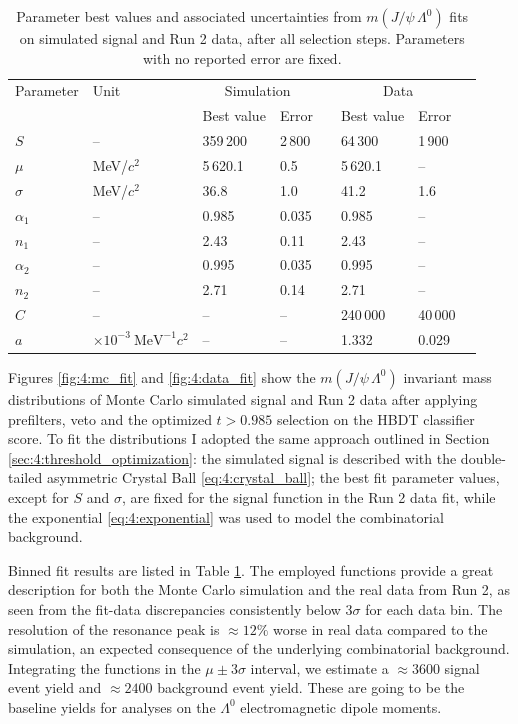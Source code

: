 \begin{table}
	\begin{center}
	\begin{tabular}{@{}llllllll@{}}
		\toprule
		Parameter
		& Unit
		& \multicolumn{2}{c}{Simulation}	& \phantom{a}
		& \multicolumn{2}{c}{Data} \\
		\cmidrule{3-4} \cmidrule{6-7}
		&& Best value	& Error				&& Best value	& Error \\
		\midrule
		$S$			& --		& 359\,200	& 2\,800&& 64\,300	& 1\,900	\\
		$\mu$		& MeV/$c^2$	& 5\,620.1 	& 0.5	&& 5\,620.1	& -- 		\\
		$\sigma$	& MeV/$c^2$	& 36.8		& 1.0	&& 41.2		& 1.6		\\
		$\alpha_1$	& --		& 0.985		& 0.035	&& 0.985	& --		\\
		$n_1$		& --		& 2.43		& 0.11	&& 2.43		& --		\\
		$\alpha_2$	& --		& 0.995		& 0.035	&& 0.995	& --		\\
		$n_2$		& --		& 2.71		& 0.14	&& 2.71		& --		\\
		$C$			& --		& --		& --	&& 240\,000	& 40\,000	\\
		$a$			& $\times {10}^{-3}~\text{MeV}^{-1}c^2$
								& --		& --	&& 1.332	& 0.029		\\
		\bottomrule
	\end{tabular}
	\end{center}
	\caption{Parameter best values and associated uncertainties from $m(J/\psi\,\Lambda^0)$ fits on simulated signal and Run 2 data, after all selection steps. Parameters with no reported error are fixed.}
	\label{tab:4:fit_results}
\end{table}

Figures \ref{fig:4:mc_fit} and \ref{fig:4:data_fit} show the $m(J/\psi\,\Lambda^0)$ invariant mass distributions of Monte Carlo simulated signal and Run 2 data after applying prefilters, \physbkgshort veto and the optimized $t > 0.985$ selection on the HBDT classifier score.
To fit the distributions I adopted the same approach outlined in Section \ref{sec:4:threshold_optimization}:
the simulated signal is described with the double-tailed asymmetric Crystal Ball \eqref{eq:4:crystal_ball};
the best fit parameter values, except for $S$ and $\sigma$, are fixed for the signal function in the Run 2 data fit, while the exponential \eqref{eq:4:exponential} was used to model the combinatorial background.

Binned fit results are listed in Table \ref{tab:4:fit_results}.
The employed functions provide a great description for both the Monte Carlo simulation and the real data from Run 2, as seen from the fit-data discrepancies consistently below $3\sigma$ for each data bin.
The resolution of the resonance peak is $\approx 12\%$ worse in real data compared to the simulation, an expected consequence of the underlying combinatorial background.
Integrating the functions in the $\mu \pm 3\sigma$ interval, we estimate a $\approx 3600$ signal event yield and $\approx 2400$ background event yield.
These are going to be the baseline yields for analyses on the $\Lambda^0$ electromagnetic dipole moments.